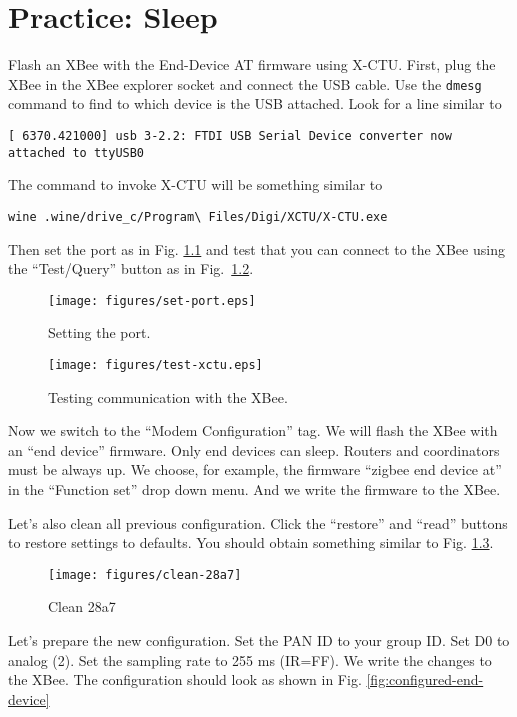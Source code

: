 \chapter{Practice: Sleep}
Flash an XBee with the End-Device AT firmware using X-CTU.
First, plug the XBee in the XBee explorer socket and connect the USB cable.
Use the \texttt{dmesg} command to find to which device is the USB attached.
Look for a line similar to

\texttt{[ 6370.421000] usb 3-2.2: FTDI USB Serial Device converter now attached to ttyUSB0}

The command to invoke X-CTU will be something similar to

\texttt{wine .wine/drive\_c/Program{\textbackslash} Files/Digi/XCTU/X-CTU.exe}

Then set the port as in Fig. \ref{fig:set-port} and test that you can connect to the XBee using the ``Test/Query'' button as in Fig.~\ref{fig:test-xctu}.
\begin{figure}[htbp]
  \centering
  \texttt{[image: figures/set-port.eps]}
  \caption{Setting the port.}
  \label{fig:set-port}
\end{figure}

\begin{figure}[htbp]
  \centering
  \texttt{[image: figures/test-xctu.eps]}
  \caption{Testing communication with the XBee.}
  \label{fig:test-xctu}
\end{figure}

Now we switch to the ``Modem Configuration'' tag.
We will flash the XBee with an ``end device'' firmware.
Only end devices can sleep.
Routers and coordinators must be always up.
We choose, for example, the firmware ``zigbee end device at'' in the ``Function set'' drop down menu.
And we write the firmware to the XBee.

Let's also clean all previous configuration.
Click the ``restore'' and ``read'' buttons to restore settings to defaults.
You should obtain something similar to Fig. \ref{fig:clean-28a7}.

\begin{figure}[htbp]
  \centering
  \texttt{[image: figures/clean-28a7]}
  \caption{Clean 28a7}
  \label{fig:clean-28a7}
\end{figure}

Let's prepare the new configuration.
Set the PAN ID to your group ID.
Set D0 to analog (2).
Set the sampling rate to 255 ms (IR=FF).
We write the changes to the XBee.
The configuration should look as shown in Fig. \ref{fig:configured-end-device}

